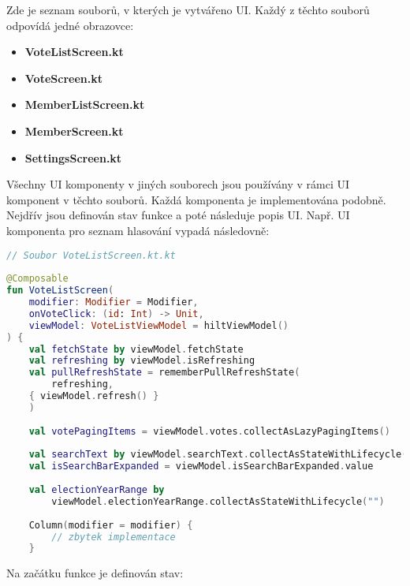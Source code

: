 \noindent Zde je seznam souborů, v kterých je vytvářeno UI. Každý z těchto souborů odpovídá jedné obrazovce:

\begin{itemize}
	\item \textbf{VoteListScreen.kt}
	\item \textbf{VoteScreen.kt}
	\item \textbf{MemberListScreen.kt}
	\item \textbf{MemberScreen.kt}
	\item \textbf{SettingsScreen.kt}
\end{itemize}

\noindent Všechny UI komponenty v jiných souborech jsou používány v rámci UI komponent v těchto souborů. Každá komponenta je implementována podobně. Nejdřív jsou definován stav funkce \linebreak a poté následuje popis UI. Např. UI komponenta pro seznam hlasování vypadá následovně:

\begin{lstlisting}[caption={Komponenta pro seznam hlasování, language=Kotlin}, tabsize=2, language=Kotlin]
// Soubor VoteListScreen.kt.kt
	
@Composable
fun VoteListScreen(
	modifier: Modifier = Modifier,
	onVoteClick: (id: Int) -> Unit,
	viewModel: VoteListViewModel = hiltViewModel()
) {
	val fetchState by viewModel.fetchState
	val refreshing by viewModel.isRefreshing
	val pullRefreshState = rememberPullRefreshState(
		refreshing,
	{ viewModel.refresh() }
	)
	
	val votePagingItems = viewModel.votes.collectAsLazyPagingItems()
	
	val searchText by viewModel.searchText.collectAsStateWithLifecycle()
	val isSearchBarExpanded = viewModel.isSearchBarExpanded.value
	
	val electionYearRange by 
		viewModel.electionYearRange.collectAsStateWithLifecycle("")
	
	Column(modifier = modifier) {
		// zbytek implementace
	}
\end{lstlisting}

\noindent Na začátku funkce je definován stav:

